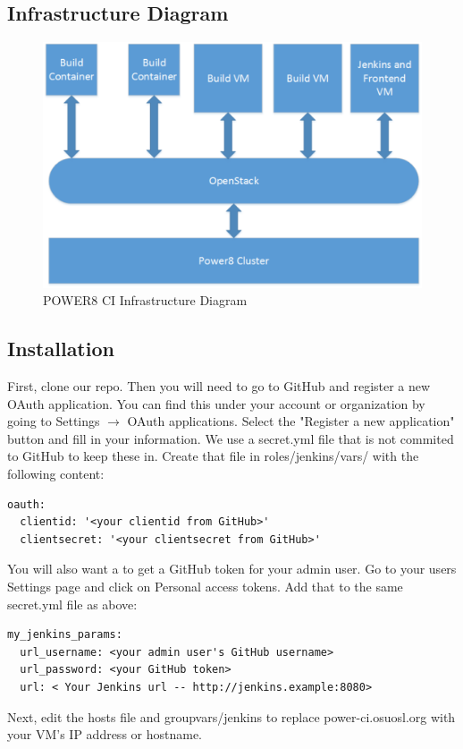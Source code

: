 \documentclass[10pt,letterpaper,onecolumn,draftclsnofoot]{IEEEtran}
\begin{document}
\subsection{Infrastructure Diagram}
\begin{figure}[H]
  \includegraphics[width=\textwidth]{images/infrastructure_diagram.eps}
  \caption{POWER8 CI Infrastructure Diagram}
\end{figure}
\subsection{Installation}

First, clone our repo. Then you will need to go to GitHub and register a new OAuth application.
You can find this under your account or organization by going to Settings $\rightarrow$ OAuth applications.
Select the "Register a new application" button and fill in your information.
We use a secret.yml file that is not commited to GitHub to keep these in.
Create that file in roles/jenkins/vars/ with the following content:

\begin{verbatim}
oauth:
  clientid: '<your clientid from GitHub>'
  clientsecret: '<your clientsecret from GitHub>'
\end{verbatim}
You will also want a to get a GitHub token for your admin user.
Go to your users Settings page and click on Personal access tokens.
Add that to the same secret.yml file as above:

\begin{verbatim}
my_jenkins_params:
  url_username: <your admin user's GitHub username>
  url_password: <your GitHub token>
  url: < Your Jenkins url -- http://jenkins.example:8080>
\end{verbatim}
Next, edit the hosts file and group\textunderscore vars/jenkins to replace power-ci.osuosl.org with your VM's IP address or hostname.
\end{document}
